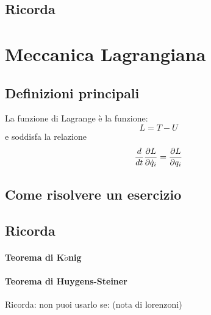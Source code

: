 \documentclass[a4paper,12pt]{article}
\begin{document}
\subsection{Ricorda}


\section{Meccanica Lagrangiana}
\subsection{Definizioni principali}
La funzione di Lagrange è la funzione:
$$ L = T - U $$
e soddisfa la relazione
$${d \over dt}\dfrac{\partial L}{\partial\dot{q}_i} = \dfrac{\partial L}{\partial q_i}$$
\subsection{Come risolvere un esercizio}

\subsection{Ricorda}
\paragraph{Teorema di K$\ddot{o}$nig}

\paragraph{Teorema di Huygens-Steiner}
Ricorda: non puoi usarlo se: (nota di lorenzoni)
\end{document}
